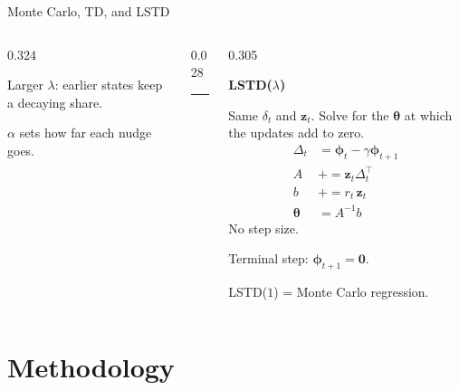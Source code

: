 \documentclass[aspectratio=169,11pt]{beamer}
\newcommand{\vphi}{\bm{\phi}}
\newcommand{\vz}{\mathbf{z}}
\newcommand{\vth}{\bm{\theta}}
\begin{document}
\begin{frame}{Monte Carlo, TD, and LSTD}
\begin{columns}[T,onlytextwidth]
\begin{column}{0.324\textwidth}
\begin{minipage}[t][4.35cm][t]{0.94\linewidth}
      Larger $\lambda$: earlier states keep a decaying share.\par
      $\alpha$ sets how far each nudge goes.
      \end{minipage}
    \end{column}
    \begin{column}{0.028\textwidth}
      \centering\textcolor{hair}{\rule{0.7pt}{4.35cm}}
    \end{column}
    \begin{column}{0.305\textwidth}
      \begin{minipage}[t][4.35cm][t]{0.94\linewidth}
      \raggedright
      {\color{accent}\small\bfseries LSTD($\lambda$)}\par\vspace{0.28em}
      Same $\delta_t$ and $\vz_t$. Solve for the $\vth$ at which the updates add to zero.
      \begin{align*}
        \Delta_t &= \vphi_t-\gamma\vphi_{t+1}\\
        A &\mathrel{+}= \vz_t\Delta_t^\top\\
        b &\mathrel{+}= r_t\,\vz_t\\
        \vth &= A^{-1}b
      \end{align*}
      No step size.\par
      Terminal step: $\vphi_{t+1}=\mathbf{0}$.\par
      LSTD($1$) = Monte Carlo regression.
      \end{minipage}
    \end{column}
  \end{columns}
\end{frame}

\section{Methodology}
\end{document}
